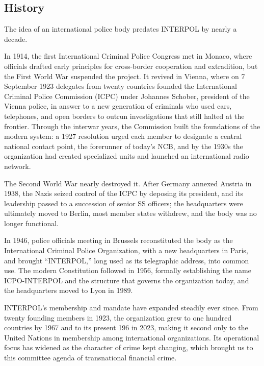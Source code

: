 \subsection{History}

The idea of an international police body predates INTERPOL by nearly a decade.

In 1914, the first International Criminal Police Congress met in Monaco, where officials drafted early principles for cross-border cooperation and extradition, but the First World War suspended the project. It revived in Vienna, where on 7 September 1923 delegates from twenty countries founded the International Criminal Police Commission (ICPC) under Johannes Schober, president of the Vienna police, in answer to a new generation of criminals who used cars, telephones, and open borders to outrun investigations that still halted at the frontier. Through the interwar years, the Commission built the foundations of the modern system: a 1927 resolution urged each member to designate a central national contact point, the forerunner of today's NCB, and by the 1930s the organization had created specialized units and launched an international radio network.

The Second World War nearly destroyed it. After Germany annexed Austria in 1938, the Nazis seized control of the ICPC by deposing its president, and its leadership passed to a succession of senior SS officers; the headquarters were ultimately moved to Berlin, most member states withdrew, and the body was no longer functional.


In 1946, police officials meeting in Brussels reconstituted the body as the International Criminal Police Organization, with a new headquarters in Paris, and brought ``INTERPOL,'' long used as its telegraphic address, into common use. The modern Constitution followed in 1956, formally establishing the name ICPO-INTERPOL and the structure that governs the organization today, and the headquarters moved to Lyon in 1989.

INTERPOL's membership and mandate have expanded steadily ever since. From twenty founding members in 1923, the organization grew to one hundred countries by 1967 and to its present 196 in 2023, making it second only to the United Nations in membership among international organizations. Its operational focus has widened as the character of crime kept changing, which brought us to this committee agenda of transnational financial crime.
